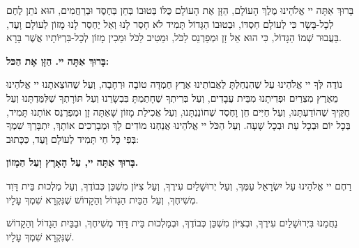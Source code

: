 \break


בָּרוּךְ אַתָּה יי אֱלֹהֵינוּ מֶלֶךְ הָעוֹלָם, הַזָּן אֶת הָעוֹלָם כֻּלּוֹ בְּטוּבוֹ בְּחֵן בְּחֶסֶד וּבְרַחֲמִים, הוּא נֹתֵן לֶחֶם לְכָל-בָּשָׂר כִּי לְעוֹלָם חַסְדּוֹ, וּבְטוּבוֹ הַגָּדוֹל תָּמִיד לֹא חָסַר לָנוּ וְאַל יֶחְסַר לָנוּ מָזוֹן לְעוֹלָם וָעֶד, בַּעֲבוּר שְׁמוֹ הַגָּדוֹל, כִּי הוּא אֵל זָן וּמְפַרְנֵס לַכֹּל, וּמֵטִיב לַכֹּל וּמֵכִין מָזוֹן לְכָל-בִּרְיּוֹתָיו אֲשֶׁר בָּרָא. 

\begin{center}
{\large \bfseries
בָּרוּךְ אַתָּה יי. הַזָּן אֶת הַכּל:
}
\end{center}


\vspace{1em}

נוֹדֶה לְּךָ יי אֱלֹהֵינוּ עַל שֶׁהִנְחַלְתָּ לַאֲבוֹתֵינוּ אֶרֶץ חֶמְדָּה טוֹבָה וּרְחָבָה, וְעַל שֶׁהוֹצֵאתָנוּ יי אֱלֹהֵינוּ מֵאֶרֶץ מִצְרַיִם וּפְדִיתָנוּ מִבֵּית עֲבָדִים, וְעַל בְּרִיתְךָ שֶׁחָתַמְתָּ בִּבְשָׂרֵנוּ וְעַל תּוֹרָתְךָ שֶׁלִּמַּדְתָּנוּ וְעַל חֻקֶּיךָ שֶׁהוֹדַעְתָּנוּ, וְעַל חַיִּים חֵן וָחֶסֶד שֶׁחוֹנַנְתָּנוּ, וְעַל אֲכִילַת מָזוֹן שָׁאַתָּה זָן וּמְפַרְנֵס אוֹתָנוּ תָּמִיד, בְּכָל יוֹם וּבְכָל עֵת וּבְכָל שָׁעָה. וְעַל הַכֹּל יי אֱלֹהֵינוּ אֲנַחְנוּ מוֹדִים לָךְ וּמְבָרְכִים אוֹתָךְ, יִתְבָּרַךְ שִׁמְךָ בְּפִי כָּל חַי תָּמִיד לְעוֹלָם וָעֶד, כַּכָּתוּב: 

\begin{center}
{\large \bfseries
בָּרוּךְ אַתָּה יי, עַל הָאָרֶץ וְעַל הַמָזוֹן.
}
\end{center}

\vspace{1em}

\begin{minipage}{0.48\linewidth}
\hfill\textenglish{}

רַחֶם יי אֱלֹהֵינוּ עַל יִשְׂרָאֵל עַמֶּךָ, וְעַל יְרוּשָׁלַיִם עִירֶךָ, וְעַל צִיּוֹן מִשְׁכַּן כְּבוֹדֶךָ, וְעַל מַלְכוּת בֵּית דָּוִד מְשִׁיחֶךָ, וְעַל הַבַּיִת הַגָדוֹל וְהַקָדוֹשׁ שֶׁנִּקְרָא שִׁמְךָ עָלָיו.
\end{minipage}\hspace{0.01\linewidth}\vrule{}\hspace{0.01\linewidth}
\begin{minipage}{0.48\linewidth}
\hfill\textenglish{}

נַחֲמֵנוּ בִּיְרוּשָׁלַיִם עִירֶךָ, וּבְצִיּוֹן מִשְׁכַּן כְּבוֹדֶךָ, וּבְמַלְכוּת בֵּית דָּוִד מְשִׁיחֶךָ, וּבַבַּיִת הַגָדוֹל וְהַקָדוֹשׁ שֶׁנִּקְרָא שִׁמְךָ עָלָיו.
\end{minipage}

